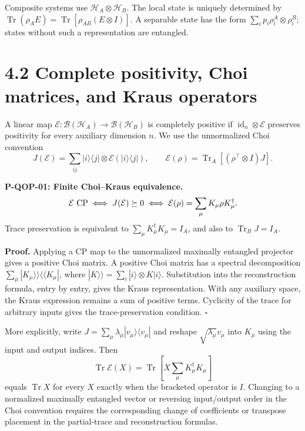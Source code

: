 \documentclass[
  11pt,
  oneside]{book}
\begin{document}
Composite systems use \(\mathcal H_A\otimes\mathcal H_B\). The local
state is uniquely determined by
\(\operatorname{Tr}(\rho_AE)=\operatorname{Tr}[\rho_{AB}(E\otimes I)]\).
A separable state has the form \(\sum_i p_i\rho_i^A\otimes\rho_i^B\);
states without such a representation are entangled.

\section{4.2 Complete positivity, Choi matrices, and Kraus operators}

A linear map
\(\mathcal E:\mathcal B(\mathcal H_A)\to\mathcal B(\mathcal H_B)\) is
completely positive if \(\operatorname{id}_n\otimes\mathcal E\)
preserves positivity for every auxiliary dimension \(n\). We use the
unnormalized Choi convention \[
J(\mathcal E)=\sum_{ij}|i\rangle\langle j|\otimes
\mathcal E(|i\rangle\langle j|),\qquad
\mathcal E(\rho)=\operatorname{Tr}_A[(\rho^\top\otimes I)J].
\]

\label{p-qop-01}{}

\textbf{P-QOP-01: Finite Choi--Kraus equivalence.} \[
\mathcal E\ {\rm CP}\iff J(\mathcal E)\succeq0
\iff\mathcal E(\rho)=\sum_\mu K_\mu\rho K_\mu^\dagger.
\] Trace preservation is equivalent to
\(\sum_\mu K_\mu^\dagger K_\mu=I_A\), and also to
\(\operatorname{Tr}_B J=I_A\).

\textbf{Proof.} Applying a CP map to the unnormalized maximally
entangled projector gives a positive Choi matrix. A positive Choi matrix
has a spectral decomposition
\(\sum_\mu|K_\mu\rangle\rangle\langle\langle K_\mu|\), where
\(|K\rangle\rangle=\sum_i|i\rangle\otimes K|i\rangle\). Substitution
into the reconstruction formula, entry by entry, gives the Kraus
representation. With any auxiliary space, the Kraus expression remains a
sum of positive terms. Cyclicity of the trace for arbitrary inputs gives
the trace-preservation condition. \(\square\)

More explicitly, write
\(J=\sum_\mu\lambda_\mu|v_\mu\rangle\langle v_\mu|\) and reshape
\(\sqrt{\lambda_\mu}v_\mu\) into \(K_\mu\) using the input and output
indices. Then \[
\operatorname{Tr}\mathcal E(X)
=\operatorname{Tr}\left[X\sum_\mu K_\mu^\dagger K_\mu\right]
\] equals \(\operatorname{Tr}X\) for every \(X\) exactly when the
bracketed operator is \(I\). Changing to a normalized maximally
entangled vector or reversing input/output order in the Choi convention
requires the corresponding change of coefficients or transpose placement
in the partial-trace and reconstruction formulas.
\end{document}
